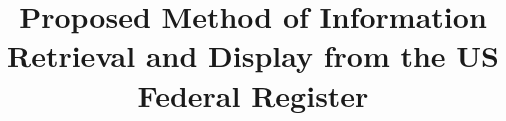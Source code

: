 \documentclass{sig-alternate-05-2015}
\begin{document}
%

\title{Proposed Method of Information Retrieval and Display from the US Federal Register}
%
%
%
%
%
\end{document}
